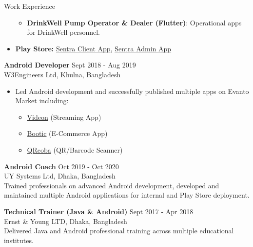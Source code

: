 \documentclass{resume}
\begin{document}
\begin{rSection}{Work Experience}
\begin{itemize}
\begin{itemize}
            \item \textbf{DrinkWell Pump Operator \& Dealer (Flutter)}: Operational apps for DrinkWell personnel.
        \end{itemize}
        \item \textbf{Play Store:} \href{https://play.google.com/store/search?q=sentra&c=apps}{Sentra Client App}, \href{https://play.google.com/store/apps/details?id=com.nybsys.sentra.admin}{Sentra Admin App}
    \end{itemize}
    \vspace{4.0cm}
    {\bf Android Developer} \hfill Sept 2018 - Aug 2019\\
    W3Engineers Ltd, Khulna, Bangladesh
    \begin{itemize}
        \itemsep -2pt
        \item Led Android development and successfully published multiple apps on Evanto Market including:
        \begin{itemize}
            \item \href{https://codecanyon.net/item/videon-a-video-streaming-android-app-with-admin-panel/23466323}{Videon} (Streaming App)
            \item \href{https://codecanyon.net/item/bootic-an-android-ecommerce-app-with-admin-panel/22131989}{Bootic} (E-Commerce App)
            \item \href{https://codecanyon.net/item/qrcoba-a-qrbarcode-generator-and-scanner-android-app-with-admob/23127768}{QRcoba} (QR/Barcode Scanner)
        \end{itemize}
    \end{itemize}

    {\bf Android Coach} \hfill Oct 2019 - Oct 2020\\
    UY Systems Ltd, Dhaka, Bangladesh\\
    Trained professionals on advanced Android development, developed and maintained multiple Android applications for internal and Play Store deployment.

        {\bf Technical Trainer (Java \& Android)} \hfill Sept 2017 - Apr 2018\\
    Ernst \& Young LTD, Dhaka, Bangladesh\\
    Delivered Java and Android professional training across multiple educational institutes.

    \end{rSection}
\end{document}
